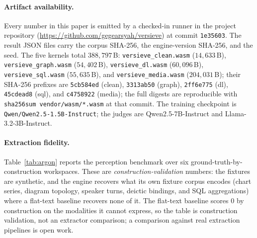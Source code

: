 \documentclass{article}
\begin{document}
\paragraph{Artifact availability.}
Every number in this paper is emitted by a checked-in runner in the project repository (\url{https://github.com/gegearsyah/versieve}) at commit \texttt{1e35603}. The result JSON files carry the corpus SHA-256, the engine-version SHA-256, and the seed. The five kernels total $388{,}797$\,B: \texttt{versieve\_clean.wasm} ($14{,}633$\,B), \texttt{versieve\_graph.wasm} ($54{,}402$\,B), \texttt{versieve\_dl.wasm} ($60{,}096$\,B), \texttt{versieve\_sql.wasm} ($55{,}635$\,B), and \texttt{versieve\_media.wasm} ($204{,}031$\,B); their SHA-256 prefixes are \texttt{5cb584ed} (clean), \texttt{3313ab50} (graph), \texttt{2ff6e775} (dl), \texttt{45cdead8} (sql), and \texttt{c4758922} (media); the full digests are reproducible with \texttt{sha256sum vendor/wasm/*.wasm} at that commit. The training checkpoint is \texttt{Qwen/Qwen2.5-1.5B-Instruct}; the judges are Qwen2.5-7B-Instruct and Llama-3.2-3B-Instruct.

\paragraph{Extraction fidelity.}
Table~\ref{tab:argon} reports the perception benchmark over six ground-truth-by-construction workspaces. These are \emph{construction-validation} numbers: the fixtures are synthetic, and the engine recovers what its own fixture corpus encodes (chart series, diagram topology, speaker turns, deictic bindings, and SQL aggregations) where a flat-text baseline recovers none of it. The flat-text baseline scores 0 by construction on the modalities it cannot express, so the table is construction validation, not an extractor comparison; a comparison against real extraction pipelines is open work.
\end{document}
